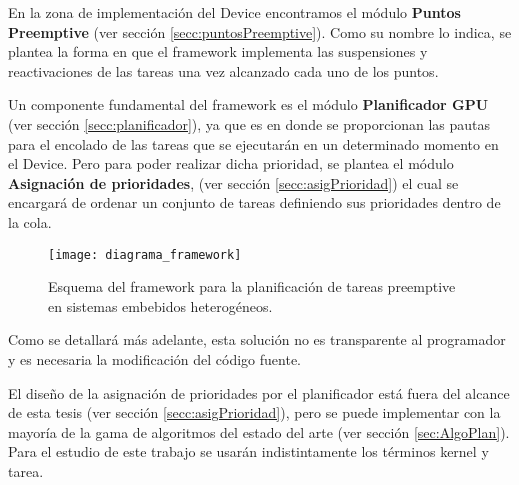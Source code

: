 En la zona de implementación del Device encontramos el módulo \textbf{Puntos Preemptive} (ver sección \ref{secc:puntosPreemptive}). Como su nombre lo indica, se plantea la forma en que el framework implementa las suspensiones y reactivaciones de las tareas una vez alcanzado cada uno de los puntos. 

Un componente fundamental del framework es el módulo \textbf{Planificador GPU} (ver sección \ref{secc:planificador}), ya que es en donde se proporcionan las pautas para el encolado de las tareas que se ejecutarán en un determinado momento en el Device. Pero para poder realizar dicha prioridad, se plantea el módulo \textbf{Asignación de prioridades}, (ver sección \ref{secc:asigPrioridad}) el cual se encargará de ordenar un conjunto de tareas definiendo sus prioridades dentro de la cola.

  \begin{figure}[!]
        \texttt{[image: diagrama\_framework]}
        \caption{Esquema del framework para la planificación de tareas preemptive en sistemas embebidos heterogéneos.}
        \label{fig:diagramabase}
    \end{figure}

Como se detallará más adelante, esta solución no es transparente al programador y es necesaria la modificación del código fuente. 

El diseño de la asignación de prioridades por el planificador está fuera del alcance de esta tesis (ver sección \ref{secc:asigPrioridad}), pero se puede implementar con la mayoría de la gama de algoritmos del estado del arte (ver sección \ref{sec:AlgoPlan}). Para el estudio de este trabajo se usarán indistintamente los términos kernel y tarea.

